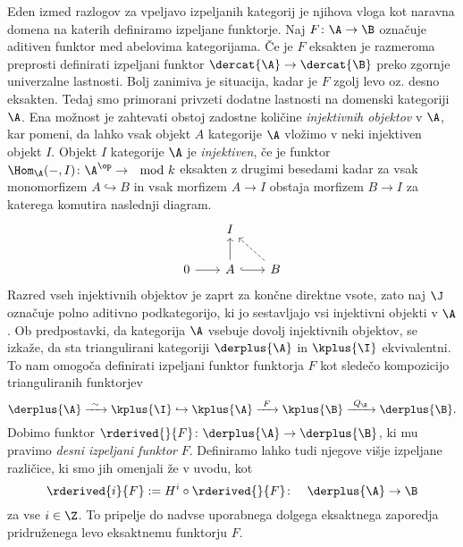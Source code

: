 Eden izmed razlogov za vpeljavo izpeljanih kategorij je njihova vloga kot naravna domena na katerih definiramo izpeljane funktorje. Naj $F \colon \A \to \B$ označuje aditiven funktor med abelovima kategorijama. Če je $F$ eksakten je razmeroma preprosti definirati izpeljani funktor $\dercat{\A} \to \dercat{\B}$ preko zgornje univerzalne lastnosti. Bolj zanimiva je situacija, kadar je $F$ zgolj levo oz. desno eksakten. Tedaj smo 
primorani privzeti dodatne lastnosti na domenski kategoriji $\A$. Ena možnost je zahtevati obstoj zadostne količine \emph{injektivnih objektov} v $\A$, kar pomeni, da lahko vsak objekt $A$ kategorije $\A$ vložimo v neki injektiven objekt $I$. Objekt $I$ kategorije $\A$ je \emph{injektiven}, če je funktor $\Hom_\A(-, I) \colon \A^\op \to \mod{k}$ eksakten \oz z drugimi besedami kadar za vsak monomorfizem $A \hookrightarrow B$ in vsak morfizem $A \to I$ obstaja morfizem $B \to I$ za katerega komutira naslednji diagram.
\[\begin{tikzcd}[column sep = 2em]
        & I \\
        0 & A & B
        \arrow[from=2-1, to=2-2]
        \arrow[from=2-2, to=1-2]
        \arrow[hook, from=2-2, to=2-3]
        \arrow[dashed, from=2-3, to=1-2]
    \end{tikzcd}\]
Razred vseh injektivnih objektov je zaprt za končne direktne vsote, zato naj $\J$ označuje polno aditivno podkategorijo, ki jo sestavljajo vsi injektivni objekti v $\A$. Ob predpostavki, da kategorija $\A$ vsebuje dovolj injektivnih objektov, se izkaže, da sta triangulirani kategoriji $\derplus{\A}$ in $\kplus{\I}$ ekvivalentni. To nam omogoča definirati izpeljani funktor funktorja $F$ kot sledečo kompozicijo trianguliranih funktorjev 
\[
    \derplus{\A} \xrightarrow{ \ \sim \ } \kplus{\I} \hookrightarrow \kplus{\A} \xrightarrow{\ F \ } \kplus{\B} \xrightarrow{\ Q_\B \ } \derplus{\B}.
\]
Dobimo funktor $\rderived{}{F} \colon \derplus{\A} \to \derplus{\B}$, ki mu pravimo \emph{desni izpeljani funktor} $F$. Definiramo lahko tudi njegove višje izpeljane različice, ki smo jih omenjali že v uvodu, kot
\[
    \rderived{i}{F} := H^i \circ \rderived{}{F} \colon \quad \derplus{\A} \to \B
\]
za vse $i \in \Z$. To pripelje do nadvse uporabnega dolgega eksaktnega zaporedja pridruženega levo eksaktnemu funktorju $F$.

